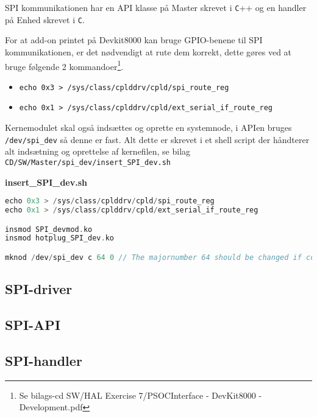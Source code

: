 


SPI kommunikationen har en API klasse på Master skrevet i \verb+C+++ og en handler på Enhed skrevet i \verb+C+.

For at add-on printet på Devkit8000 kan bruge GPIO-benene til SPI kommunikationen, er
det nødvendigt at rute dem korrekt, dette gøres ved at bruge følgende 2 kommandoer\footnote{Se bilags-cd SW/HAL Exercise 7/PSOCInterface - DevKit8000 - Development.pdf}.


\begin{itemize}
\item \verb+echo 0x3 > /sys/class/cplddrv/cpld/spi_route_reg+
\item \verb+echo 0x1 > /sys/class/cplddrv/cpld/ext_serial_if_route_reg+
\end{itemize}

Kernemodulet skal også indsættes og oprette en systemnode, i APIen bruges \verb+/dev/spi_dev+ så denne er fast.
Alt dette er skrevet i et shell script der håndterer alt indsætning og oprettelse af kernefilen, se bilag \verb+CD/SW/Master/spi_dev/insert_SPI_dev.sh+

\textbf{insert\_SPI\_dev.sh}

\begin{lstlisting}[language=C]
echo 0x3 > /sys/class/cplddrv/cpld/spi_route_reg
echo 0x1 > /sys/class/cplddrv/cpld/ext_serial_if_route_reg

insmod SPI_devmod.ko
insmod hotplug_SPI_dev.ko

mknod /dev/spi_dev c 64 0 // The majornumber 64 should be changed if conflict occur
\end{lstlisting}


\subsection{SPI-driver}



\subsection{SPI-API}




\subsection{SPI-handler}



